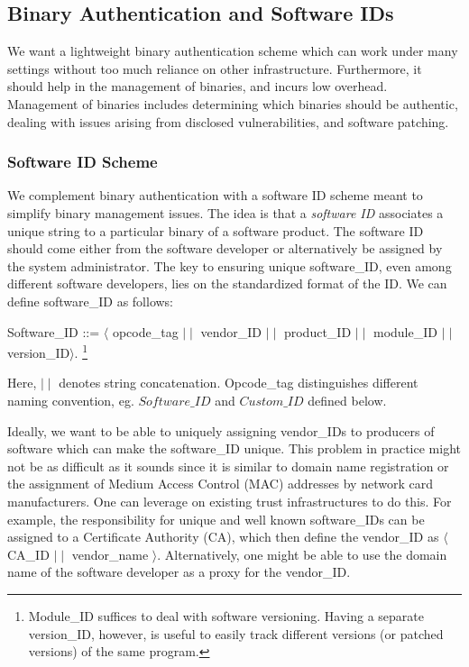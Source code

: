 \subsection{Binary Authentication and Software IDs}
\label{sect:scheme}

We want a lightweight binary authentication scheme which can work
under many settings without too much reliance on other infrastructure.
Furthermore, it should help in the management of binaries, and incurs low overhead.
Management of binaries includes determining which binaries should be
authentic, dealing with issues arising from disclosed vulnerabilities,
and software patching.

\subsubsection{Software ID Scheme}


We complement binary authentication with a software ID scheme meant
to simplify binary management issues.
The idea is that a {\em software ID} associates a
unique string to a particular binary of a software product.
The software ID should come either from the software developer
or alternatively be assigned by the system administrator.
The key to ensuring unique software\_ID, even among different
software developers, lies on the standardized format of the ID.
We can define software\_ID as follows:
\begin{center}
\small
Software\_ID ::= $\langle$ opcode\_tag $\mid\mid$ vendor\_ID $\mid\mid$ 
product\_ID $\mid\mid$ module\_ID $\mid\mid$ version\_ID$\rangle$.
\footnote{Module\_ID suffices to deal with software versioning.
Having a separate version\_ID, however, is useful to easily
track different versions (or patched versions) of the same program.}
\end{center}
\noindent 
Here, $\mid\mid$ denotes string concatenation.
Opcode\_tag distinguishes different naming convention, eg.
$Software\_ID$ and $Custom\_ID$ defined below.

Ideally, we want to be able to uniquely assigning vendor\_IDs to
producers of software which can make the software\_ID unique.
This problem in practice might not be as difficult as it sounds since
it is similar to domain name registration or the assignment
of Medium Access Control (MAC) addresses by network card manufacturers.
One can leverage on existing trust infrastructures to do this.
For example, the responsibility for unique and well known software\_IDs
can be assigned to a Certificate Authority (CA), which then 
define the vendor\_ID as $\langle$ CA\_ID $\mid\mid$ vendor\_name $\rangle$. 
Alternatively, one might be able to use the domain name of the 
software developer as a proxy for the vendor\_ID.

